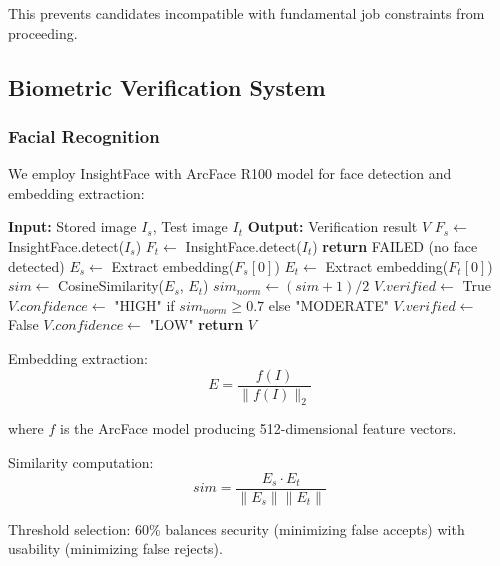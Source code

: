 \documentclass[conference]{IEEEtran}
\begin{document}
This prevents candidates incompatible with fundamental job constraints from proceeding.

\subsection{Biometric Verification System}

\subsubsection{Facial Recognition}

We employ InsightFace with ArcFace R100 model for face detection and embedding extraction:

\begin{algorithm}[h]
\caption{Face Verification}
\label{alg:face_verify}
\begin{algorithmic}[1]
\STATE \textbf{Input:} Stored image $I_s$, Test image $I_t$
\STATE \textbf{Output:} Verification result $V$
\STATE
\STATE $F_s \leftarrow$ InsightFace.detect($I_s$)
\STATE $F_t \leftarrow$ InsightFace.detect($I_t$)
    \STATE \textbf{return} FAILED (no face detected)
\ENDIF
\STATE $E_s \leftarrow$ Extract embedding($F_s[0]$) 
\STATE $E_t \leftarrow$ Extract embedding($F_t[0]$) 
\STATE $sim \leftarrow$ CosineSimilarity($E_s$, $E_t$)
\STATE $sim_{norm} \leftarrow (sim + 1) / 2$ 
    \STATE $V.verified \leftarrow$ True
    \STATE $V.confidence \leftarrow$ "HIGH" if $sim_{norm} \geq 0.7$ else "MODERATE"
\ELSE
    \STATE $V.verified \leftarrow$ False
    \STATE $V.confidence \leftarrow$ "LOW"
\ENDIF
\STATE \textbf{return} $V$
\end{algorithmic}
\end{algorithm}

Embedding extraction:
\begin{equation}
E = \frac{f(I)}{\|f(I)\|_2}
\end{equation}

where $f$ is the ArcFace model producing 512-dimensional feature vectors.

Similarity computation:
\begin{equation}
sim = \frac{E_s \cdot E_t}{\|E_s\| \|E_t\|}
\end{equation}

Threshold selection: 60\% balances security (minimizing false accepts) with usability (minimizing false rejects).
\end{document}
